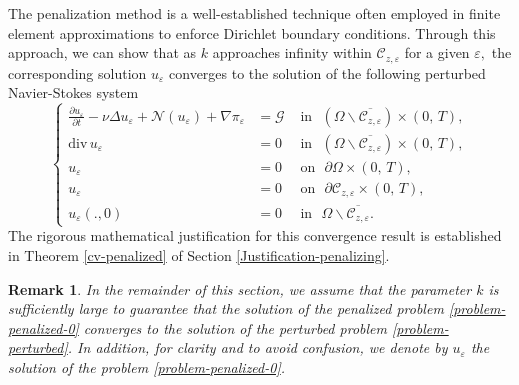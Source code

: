\documentclass[a4paper,12pt,reqno,natbib]{amsart}
\newtheorem{remark}[theorem]{Remark}
\def\N{\mathcal N}
\begin{document}
The penalization method is a well-established technique often employed in finite element approximations to enforce Dirichlet boundary conditions. Through this approach, we can show that as $k$ approaches infinity within $\mathcal{C}_{z,\varepsilon}$ for a given
$\varepsilon,$ the corresponding solution $u_\varepsilon$
converges to the solution of the following perturbed Navier-Stokes system 
\begin{equation}\label{problem-perturbed}
\left\{
\begin{array}{rll}
\displaystyle \frac {\partial u_\varepsilon}{\partial t}-\nu
\Delta u_\varepsilon+ \N(u_\varepsilon)+ \nabla \pi_\varepsilon
 &= \mathcal{G} &\mbox{ in }  \,\,(\Omega\backslash\overline{\mathcal{C}_{z,\varepsilon}})\times (0,\,T) ,\\
\mbox{div}\, u_\varepsilon &=  0 & \mbox{ in } \,\, (\Omega\backslash\overline{\mathcal{C}_{z,\varepsilon}}) \times (0,\,T) ,\\
u_\varepsilon &= 0 & \mbox{ on }\,\,  \partial\Omega \times (0,\,T) , \\
u_\varepsilon &=  0 & \mbox{ on } \,\, \partial\mathcal{C}_{z,\varepsilon} \times (0,\,T) ,\\
u_\varepsilon(.,0)&= 0&\mbox{ in } \,\,  \Omega\backslash\overline{\mathcal{C}_{z,\varepsilon}}.
\end{array}
 \right.
\end{equation}
The rigorous mathematical justification for this convergence result is established in Theorem \ref{cv-penalized} of Section \ref{Justification-penalizing}.

\begin{remark}In the remainder of this section, we assume that the parameter $k$ is sufficiently large to guarantee that the solution of the penalized problem \eqref{problem-penalized-0} converges to the solution of the perturbed problem \eqref{problem-perturbed}. In addition, for clarity and to avoid confusion, we denote by $u_\varepsilon$ the solution of the problem \eqref{problem-penalized-0}.
\end{remark}
\end{document}
